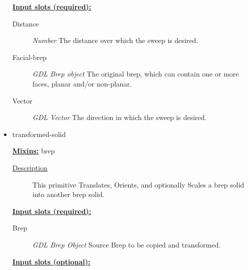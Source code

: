 \documentclass [11pt]{book}
\begin{document}
\begin{itemize}
\textbf{
\underline{Input slots (required):}}

\begin{description}

\item [Distance]
\emph{Number} The distance over which the sweep is desired.


\item [Facial-brep]
\emph{GDL Brep object} The original brep, which can contain one or more faces, planar and/or non-planar.


\item [Vector]
\emph{GDL Vector} The direction in which the sweep is desired.


\end{description}







\item {}transformed-solid


\textbf{
\underline{Mixins:}} brep





\begin{description}

\item [
\underline{Description}]


This primitive Translates, Orients, and optionally Scales a brep solid into another brep solid.



\end{description}








\textbf{
\underline{Input slots (required):}}

\begin{description}

\item [Brep]
\emph{GDL Brep Object} Source Brep to be copied and transformed.


\end{description}






\textbf{
\underline{Input slots (optional):}}

\begin{description}


\end{description}
\end{itemize}
\end{document}
